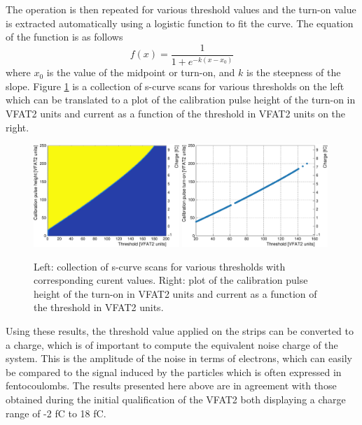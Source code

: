       The operation is then repeated for various threshold values and the turn-on value is extracted automatically using a logistic function to fit the curve. The equation of the function is as follows
      \begin{equation}
        f(x) = \frac{1}{1 + e^{-k \left( x - x_0 \right)}}
      \end{equation}
      where $ x_0 $ is the value of the midpoint or turn-on, and $ k $ is the steepness of the slope. Figure \ref{fig:II-5-scurves} is a collection of s-curve scans for various thresholds on the left which can be translated to a plot of the calibration pulse height of the turn-on in VFAT2 units and current as a function of the threshold in VFAT2 units on the right. \\

      \begin{figure}[h!]
        \centering
        \includegraphics[width=0.49\textwidth]{img/plots/cSCurve_ThresholdVCal-crop}
        \includegraphics[width=0.49\textwidth]{img/plots/cSCurve_TurnOn-crop}
        \caption{Left: collection of s-curve scans for various thresholds with corresponding curent values. Right: plot of the calibration pulse height of the turn-on in VFAT2 units and current as a function of the threshold in VFAT2 units.}
        \label{fig:II-5-scurves}
      \end{figure}

      Using these results, the threshold value applied on the strips can be converted to a charge, which is of important to compute the equivalent noise charge of the system. This is the amplitude of the noise in terms of electrons, which can easily be compared to the signal induced by the particles which is often expressed in fentocoulombs. The results presented here above are in agreement with those obtained during the initial qualification of the VFAT2 \cite{Aspell:1267947} both displaying a charge range of -2 fC to 18 fC.

